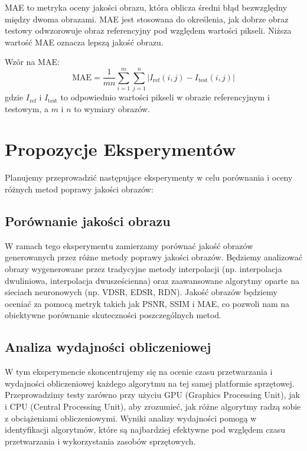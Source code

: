 \documentclass[10pt]{article}
\begin{document}
MAE to metryka oceny jakości obrazu, która oblicza średni błąd bezwzględny między dwoma obrazami. MAE jest stosowana do określenia, jak dobrze obraz testowy odwzorowuje obraz referencyjny pod względem wartości pikseli. Niższa wartość MAE oznacza lepszą jakość obrazu.

Wzór na MAE:
\begin{equation}
    \text{MAE} = \frac{1}{mn} \sum_{i=1}^{m} \sum_{j=1}^{n} \left| I_{\text{ref}}(i,j) - I_{\text{test}}(i,j) \right|
\end{equation}
gdzie \(I_{\text{ref}}\) i \(I_{\text{test}}\) to odpowiednio wartości pikseli w obrazie referencyjnym i testowym, a \(m\) i \(n\) to wymiary obrazów.

\newpage
\section*{Propozycje Eksperymentów}

Planujemy przeprowadzić następujące eksperymenty w celu porównania i oceny różnych metod poprawy jakości obrazów:

\subsection*{Porównanie jakości obrazu}

W ramach tego eksperymentu zamierzamy porównać jakość obrazów generowanych przez różne metody poprawy jakości obrazów. Będziemy analizować obrazy wygenerowane przez tradycyjne metody interpolacji (np. interpolacja dwuliniowa, interpolacja dwusześcienna) oraz zaawansowane algorytmy oparte na sieciach neuronowych (np. VDSR, EDSR, RDN). Jakość obrazów będziemy oceniać za pomocą metryk takich jak PSNR, SSIM i MAE, co pozwoli nam na obiektywne porównanie skuteczności poszczególnych metod.

\subsection*{Analiza wydajności obliczeniowej}

W tym eksperymencie skoncentrujemy się na ocenie czasu przetwarzania i wydajności obliczeniowej każdego algorytmu na tej samej platformie sprzętowej. Przeprowadzimy testy zarówno przy użyciu GPU (Graphics Processing Unit), jak i CPU (Central Processing Unit), aby zrozumieć, jak różne algorytmy radzą sobie z obciążeniami obliczeniowymi. Wyniki analizy wydajności pomogą w identyfikacji algorytmów, które są najbardziej efektywne pod względem czasu przetwarzania i wykorzystania zasobów sprzętowych.
\newpage
\end{document}
